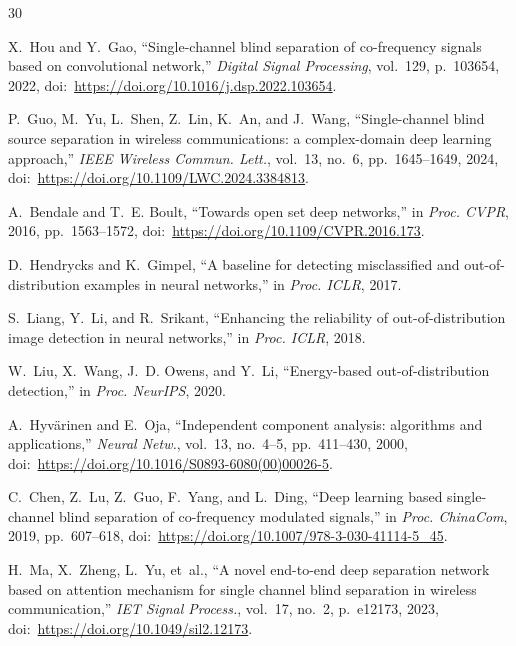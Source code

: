 \documentclass[review,12pt]{elsarticle}
\begin{document}
\begin{thebibliography}{30}\footnotesize

X.~Hou and Y.~Gao,
``Single-channel blind separation of co-frequency signals based on
convolutional network,''
\emph{Digital Signal Processing}, vol.~129, p.~103654, 2022,
doi:~\url{https://doi.org/10.1016/j.dsp.2022.103654}.

P.~Guo, M.~Yu, L.~Shen, Z.~Lin, K.~An, and J.~Wang,
``Single-channel blind source separation in wireless communications: a
complex-domain deep learning approach,''
\emph{IEEE Wireless Commun. Lett.}, vol.~13, no.~6, pp.~1645--1649,
2024, doi:~\url{https://doi.org/10.1109/LWC.2024.3384813}.

A.~Bendale and T.~E. Boult,
``Towards open set deep networks,''
in \emph{Proc. CVPR}, 2016, pp.~1563--1572,
doi:~\url{https://doi.org/10.1109/CVPR.2016.173}.

D.~Hendrycks and K.~Gimpel,
``A baseline for detecting misclassified and out-of-distribution
examples in neural networks,''
in \emph{Proc. ICLR}, 2017.

S.~Liang, Y.~Li, and R.~Srikant,
``Enhancing the reliability of out-of-distribution image detection in
neural networks,''
in \emph{Proc. ICLR}, 2018.

W.~Liu, X.~Wang, J.~D. Owens, and Y.~Li,
``Energy-based out-of-distribution detection,''
in \emph{Proc. NeurIPS}, 2020.

A.~Hyv{\"a}rinen and E.~Oja,
``Independent component analysis: algorithms and applications,''
\emph{Neural Netw.}, vol.~13, no.~4--5, pp.~411--430, 2000,
doi:~\url{https://doi.org/10.1016/S0893-6080(00)00026-5}.

C.~Chen, Z.~Lu, Z.~Guo, F.~Yang, and L.~Ding,
``Deep learning based single-channel blind separation of co-frequency
modulated signals,''
in \emph{Proc. ChinaCom}, 2019, pp.~607--618,
doi:~\url{https://doi.org/10.1007/978-3-030-41114-5_45}.

H.~Ma, X.~Zheng, L.~Yu, et~al.,
``A novel end-to-end deep separation network based on attention
mechanism for single channel blind separation in wireless
communication,''
\emph{IET Signal Process.}, vol.~17, no.~2, p.~e12173, 2023,
doi:~\url{https://doi.org/10.1049/sil2.12173}.


\end{thebibliography}
\end{document}
